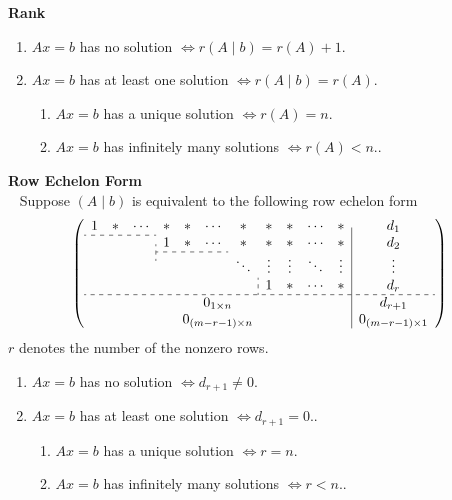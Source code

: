 \documentclass{report}
\theoremstyle{nonumberplain}
\begin{document}
\noindent\textbf{Rank}
\begin{enumerate}
	\item $Ax=b$ has no solution $\iff r\left(A\mid b\right)=r(A)+1$.
	\item $Ax=b$ has at least one solution $\iff r\left(A\mid b\right)=r(A)$.
	\begin{enumerate}
		\item $Ax=b$ has a unique solution $\iff r(A)=n$.
		\item $Ax=b$ has infinitely many solutions $\iff r(A)<n$..
	\end{enumerate}
\end{enumerate}

\noindent\textbf{Row Echelon Form}\\~
Suppose $\left(A\mid b\right)$ is equivalent to the following row echelon form
\[
	\left(\begin{array}{ccccccccccc|c}
			1                              & *                                     & \cdots & *                 & * & \cdots & *      & *      & *      & \cdots & *      & d_1     \\\cdashline{1-3}[3pt/3pt]
			\multicolumn{3}{c;{3pt/3pt}}{} & 1                                     & *      & \cdots            & * & *      & *      & \cdots & *      & d_2                        \\\cdashline{4-6}[3pt/3pt]
			                               &                                       &        &                   &   &        & \ddots & \vdots & \vdots & \ddots & \vdots & \vdots \\
			\multicolumn{7}{c;{3pt/3pt}}{} & 1                                     & *      & \cdots            & * & d_r                                                           \\\hdashline[3pt/3pt]
			& \multicolumn{9}{c}{0_{1\times n}} &        & d_{r+1}\\
			                               & \multicolumn{9}{c}{0_{(m-r-1)\times n}} &        & 0_{(m-r-1)\times 1}
		\end{array}\right)
\]
$r$ denotes the number of the nonzero rows.
\begin{enumerate}
	\item $Ax=b$ has no solution $\iff d_{r+1}\ne 0$.
	\item $Ax=b$ has at least one solution $\iff d_{r+1}=0$..
	\begin{enumerate}
		\item $Ax=b$ has a unique solution $\iff r=n$.
		\item $Ax=b$ has infinitely many solutions $\iff r<n$..
	\end{enumerate}
\end{enumerate}
\end{document}

